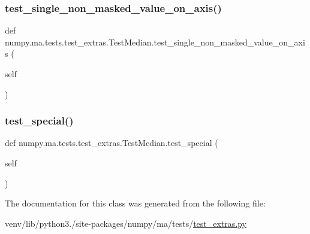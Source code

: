 \subsubsection{\texorpdfstring{test\+\_\+single\+\_\+non\+\_\+masked\+\_\+value\+\_\+on\+\_\+axis()}{test\_single\_non\_masked\_value\_on\_axis()}}
{\footnotesize\ttfamily def numpy.\+ma.\+tests.\+test\+\_\+extras.\+Test\+Median.\+test\+\_\+single\+\_\+non\+\_\+masked\+\_\+value\+\_\+on\+\_\+axis (\begin{DoxyParamCaption}\item[{}]{self }\end{DoxyParamCaption})}

\mbox{\label{classnumpy_1_1ma_1_1tests_1_1test__extras_1_1TestMedian_ac389d11a9d33e44de6e0531464c62f69}} 
\subsubsection{\texorpdfstring{test\+\_\+special()}{test\_special()}}
{\footnotesize\ttfamily def numpy.\+ma.\+tests.\+test\+\_\+extras.\+Test\+Median.\+test\+\_\+special (\begin{DoxyParamCaption}\item[{}]{self }\end{DoxyParamCaption})}



The documentation for this class was generated from the following file\+:\begin{DoxyCompactItemize}
\item 
venv/lib/python3./site-\/packages/numpy/ma/tests/\hyperlink{test__extras_8py}{test\+\_\+extras.\+py}\end{DoxyCompactItemize}
